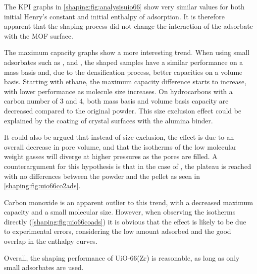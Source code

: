 The \gls{KPI} graphs in \autoref{shaping:fig:analysisuio66} show very
similar values for both initial Henry's constant and initial
enthalpy of adsorption. It is therefore apparent that the shaping process
did not change the interaction of the adsorbate with the MOF surface.

The maximum capacity graphs show a more interesting trend.
When using small adsorbates such as ,  and ,
the shaped samples have a similar performance on a mass basis and,
due to the densification process, better capacities on a volume
basis. Starting with ethane, the maximum capacity difference starts
to increase, with lower performance as molecule size increases.
On hydrocarbons with a carbon number of 3 and 4, both mass basis and
volume basis capacity are decreased compared to the original powder.
This size exclusion effect could be explained by the coating of
crystal surfaces with the alumina binder.

It could also be argued that instead of size exclusion, the effect is due to
an overall decrease in pore volume, and that the isotherms of the
low molecular weight gasses will diverge at higher pressures
as the pores are filled. A counterargument for this hypothesis is that
in the case of , the plateau is reached with no differences
between the powder and the pellet as seen
in \autoref{shaping:fig:uio66co2ads}.

Carbon monoxide is an apparent outlier to this trend, with a
decreased maximum capacity and a small molecular size.
However, when observing the isotherms directly
(\autoref{shaping:fig:uio66coads}) it is obvious that the effect is
likely to be due to experimental errors, considering
the low amount adsorbed and the good overlap in the enthalpy
curves.

Overall, the shaping performance of UiO-66(Zr) is
reasonable, as long as only small adsorbates are used.
